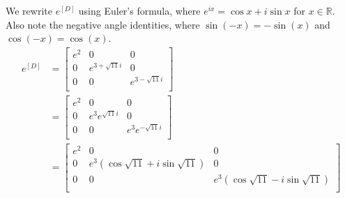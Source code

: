 \documentclass[12pt, letterpaper]{article}
\newcommand{\R}{\mathbb{R}}
\begin{document}
We rewrite $e^{[D]}$ using Euler's formula, where $e^{ix} = \cos x + i\sin x$ for $x \in \R$. Also note the negative angle identities, where $\sin(-x) = -\sin(x)$ and $\cos(-x) = \cos(x)$.
\begin{align*}
e^{[D]} &= \begin{bmatrix}
		e^2 & 0 & 0 \\
		0 & e^{3 + \sqrt{11}i} & 0 \\
		0 & 0 & e^{3 - \sqrt{11}i} \\
		\end{bmatrix} \\
		&= 
		\begin{bmatrix}
		e^2 & 0 & 0 \\
		0 & e^{3}e^{\sqrt{11}i} & 0 \\
		0 & 0 & e^{3}e^{-\sqrt{11}i} \\
		\end{bmatrix} \\
		&=
		\begin{bmatrix}
		e^2 & 0 & 0 \\
		0 & e^{3}(\cos \sqrt{11} + i\sin \sqrt{11}) & 0 \\
		0 & 0 & e^{3}(\cos \sqrt{11} - i\sin \sqrt{11}) \\
		\end{bmatrix}
\end{align*}
\end{document}
